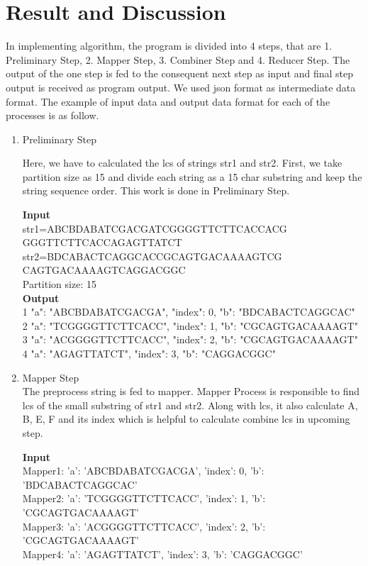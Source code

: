 \documentclass[journal,twoside]{IEEEtran}
\begin{document}
\section{Result and Discussion}
In implementing algorithm, the program is divided into 4 steps, that are 1. Preliminary Step, 2. Mapper Step, 3. Combiner Step and 4. Reducer Step. The output of the one step is fed to the consequent next step as input and final step output is received as program output. We used json format as intermediate data format. The example of input data and output data format for each of the processes is as follow.

\begin{enumerate}
    \item Preliminary Step

Here, we have to calculated the lcs of strings str1 and str2. First, we take partition size as 15 and divide each string as a 15 char substring and keep the string sequence order. This work is done in Preliminary Step.

\textbf{Input}\\
str1=ABCBDABATCGACGATCGGGGTTCTTCACCACG\\
 GGGTTCTTCACCAGAGTTATCT \\
str2=BDCABACTCAGGCACCGCAGTGACAAAAGTCG\\CAGTGACAAAAGTCAGGACGGC\\
Partition size: 15\\

\textbf{Output}\\
1   {"a": "ABCBDABATCGACGA", "index": 0, "b": "BDCABACTCAGGCAC"}\\
2  {"a": "TCGGGGTTCTTCACC", "index": 1, "b": "CGCAGTGACAAAAGT"}\\
3  {"a": "ACGGGGTTCTTCACC", "index": 2, "b": "CGCAGTGACAAAAGT"}\\
4  {"a": "AGAGTTATCT", "index": 3, "b": "CAGGACGGC"}\\

\item Mapper Step\\
The preprocess string is fed to mapper. Mapper Process is responsible to find lcs of the small substring of str1 and str2. Along with lcs, it also calculate A, B, E, F and its index which is helpful to calculate combine lcs in upcoming step.

\textbf{Input}\\
Mapper1:  {'a': 'ABCBDABATCGACGA', 'index': 0, 'b': 'BDCABACTCAGGCAC'}\\
Mapper2:  {'a': 'TCGGGGTTCTTCACC', 'index': 1, 'b': 'CGCAGTGACAAAAGT'}\\
Mapper3:  {'a': 'ACGGGGTTCTTCACC', 'index': 2, 'b': 'CGCAGTGACAAAAGT'}\\
Mapper4:  {'a': 'AGAGTTATCT', 'index': 3, 'b': 'CAGGACGGC'}\\


\end{enumerate}
\end{document}
